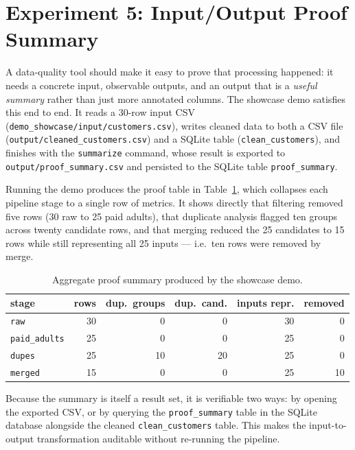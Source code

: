 \section{Experiment 5: Input/Output Proof Summary}

A data-quality tool should make it easy to prove that processing happened: it
needs a concrete input, observable outputs, and an output that is a
\emph{useful summary} rather than just more annotated columns. The showcase demo
satisfies this end to end. It reads a 30-row input CSV
(\texttt{demo\_showcase/input/customers.csv}), writes cleaned data to both a CSV
file (\texttt{output/cleaned\_customers.csv}) and a SQLite table
(\texttt{clean\_customers}), and finishes with the \texttt{summarize} command,
whose result is exported to \texttt{output/proof\_summary.csv} and persisted to
the SQLite table \texttt{proof\_summary}.

Running the demo produces the proof table in Table~\ref{tab:proof}, which
collapses each pipeline stage to a single row of metrics. It shows directly that
filtering removed five rows (30 raw to 25 paid adults), that duplicate analysis
flagged ten groups across twenty candidate rows, and that merging reduced the
25 candidates to 15 rows while still representing all 25 inputs --- i.e.\ ten
rows were removed by merge.

\begin{table}[H]
\centering
\caption{Aggregate proof summary produced by the showcase demo.}
\label{tab:proof}
\renewcommand{\arraystretch}{1.3}
\begin{tabular}{|l|r|r|r|r|r|}
\hline
\textbf{stage} & \textbf{rows} & \textbf{dup.\ groups} & \textbf{dup.\ cand.} &
\textbf{inputs repr.} & \textbf{removed} \\
\hline
\texttt{raw}         & 30 & 0  & 0  & 30 & 0  \\
\hline
\texttt{paid\_adults} & 25 & 0  & 0  & 25 & 0  \\
\hline
\texttt{dupes}       & 25 & 10 & 20 & 25 & 0  \\
\hline
\texttt{merged}      & 15 & 0  & 0  & 25 & 10 \\
\hline
\end{tabular}
\end{table}

Because the summary is itself a result set, it is verifiable two ways: by
opening the exported CSV, or by querying the \texttt{proof\_summary} table in the
SQLite database alongside the cleaned \texttt{clean\_customers} table. This makes
the input-to-output transformation auditable without re-running the pipeline.

